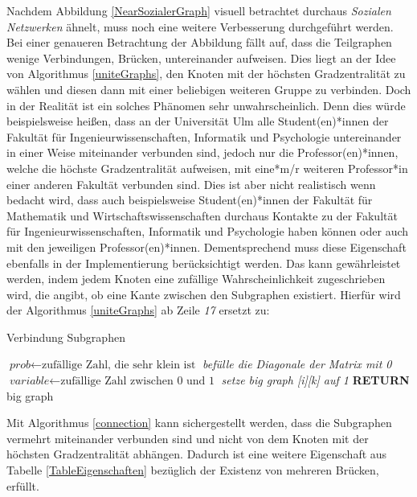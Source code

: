 \newpage
Nachdem Abbildung \ref{NearSozialerGraph} visuell betrachtet durchaus \textit{Sozialen Netzwerken} ähnelt, muss noch eine weitere Verbesserung durchgeführt werden. Bei einer genaueren Betrachtung der Abbildung fällt auf, dass die Teilgraphen wenige Verbindungen, Brücken, untereinander aufweisen. Dies liegt an der Idee von Algorithmus \ref{uniteGraphs}, den Knoten mit der höchsten Gradzentralität zu wählen und diesen dann mit einer beliebigen weiteren Gruppe zu verbinden. Doch in der Realität ist ein solches Phänomen sehr unwahrscheinlich. Denn dies würde beispielsweise heißen, dass an der Universität Ulm alle Student(en)*innen der Fakultät für Ingenieurwissenschaften, Informatik und Psychologie untereinander in einer Weise miteinander verbunden sind, jedoch nur die Professor(en)*innen, welche die höchste Gradzentralität aufweisen, mit eine*m/r weiteren Professor*in einer anderen Fakultät verbunden sind. Dies ist aber nicht realistisch wenn bedacht wird, dass auch beispielsweise Student(en)*innen der Fakultät für Mathematik und Wirtschaftswissenschaften durchaus Kontakte zu der Fakultät für Ingenieurwissenschaften, Informatik und Psychologie haben können oder auch mit den jeweiligen Professor(en)*innen. Dementsprechend muss diese Eigenschaft ebenfalls in der Implementierung berücksichtigt werden. Das kann gewährleistet werden, indem jedem Knoten eine zufällige Wahrscheinlichkeit zugeschrieben wird, die angibt, ob eine Kante zwischen den Subgraphen existiert. Hierfür wird der Algorithmus \ref{uniteGraphs} ab Zeile \textit{17} ersetzt zu:

\begin{algorithm}
\caption{Verbindung Subgraphen}\label{connection}
\begin{algorithmic}[1]
\State $\textit{prob} \gets \text{zufällige Zahl, die sehr klein ist}$
\State \textit{befülle die Diagonale der Matrix mit 0}
\EndFor
{}
\State $\textit{variable} \gets \text{zufällige Zahl zwischen 0 und 1}$
\State \textit{setze big graph [i][k] auf 1}
\EndIf
\EndFor
\EndFor
\textbf{RETURN} big graph
\EndProcedure
\end{algorithmic}
\end{algorithm}

Mit Algorithmus \ref{connection} kann sichergestellt werden, dass die Subgraphen vermehrt miteinander verbunden sind und nicht von dem Knoten mit der höchsten Gradzentralität abhängen. Dadurch ist eine weitere Eigenschaft aus Tabelle \ref{TableEigenschaften} bezüglich der Existenz von mehreren Brücken, erfüllt.


